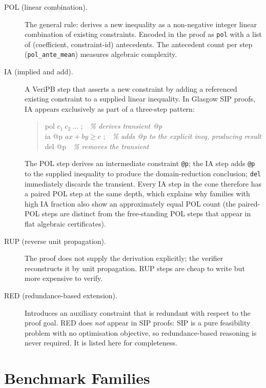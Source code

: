 \documentclass[11pt,a4paper]{article}
\begin{document}
\begin{description}
  \item[POL (linear combination).] The general rule: derives a new inequality as a non-negative
    integer linear combination of existing constraints.
    Encoded in the proof as \texttt{pol} with a list of (coefficient, constraint-id) antecedents.
    The antecedent count per step (\texttt{pol\_ante\_mean}) measures algebraic complexity.

  \item[IA (implied and add).] A VeriPB step that asserts a new constraint by adding a referenced
    existing constraint to a supplied linear inequality.
    In Glasgow SIP proofs, IA appears exclusively as part of a three-step pattern:
    \begin{quote}\ttfamily
      pol $c_1\ c_2\ \ldots$ ;\ \ \emph{\% derives transient @p}\\
      ia @p $a x + b y \ge c$ ;\ \ \emph{\% adds @p to the explicit ineq, producing result}\\
      del @p\ \ \emph{\% removes the transient}
    \end{quote}
    The POL step derives an intermediate constraint \texttt{@p}; the IA step adds \texttt{@p} to
    the supplied inequality to produce the domain-reduction conclusion; \texttt{del} immediately
    discards the transient.
    Every IA step in the cone therefore has a paired POL step at the same depth, which explains
    why families with high IA fraction also show an approximately equal POL count
    (the paired-POL steps are distinct from the free-standing POL steps that appear in
    flat algebraic certificates).

  \item[RUP (reverse unit propagation).] The proof does not supply the derivation explicitly;
    the verifier reconstructs it by unit propagation.
    RUP steps are cheap to write but more expensive to verify.

  \item[RED (redundance-based extension).] Introduces an auxiliary constraint that is redundant
    with respect to the proof goal.
    RED does \emph{not} appear in SIP proofs: SIP is a pure feasibility problem with no
    optimisation objective, so redundance-based reasoning is never required.
    It is listed here for completeness.
\end{description}

\section{Benchmark Families}
\end{document}
